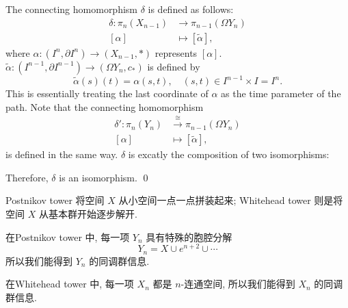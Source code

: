     The connecting homomorphism $\delta$ is defined as follows:
    \begin{align*}
        \delta: \pi_{n}(X_{n-1}) &\to \pi_{n-1}(\Omega Y_n) \\
        [\alpha] &\mapsto [\tilde{\alpha}],
    \end{align*}
    where $\alpha: (I^n,\partial I^n) \to (X_{n-1},*)$ represents $[\alpha]$. 
    $\tilde{\alpha}: (I^{n-1},\partial I^{n-1}) \to (\Omega Y_n,c_*)$ 
    is defined by 
    \begin{equation*}
        \tilde{\alpha}(s)(t) = \alpha(s,t), 
        \quad (s,t)\in I^{n-1}\times I = I^n. 
    \end{equation*}
    This is essentially treating the last coordinate of $\alpha$ 
    as the time parameter of the path. Note that the connecting homomorphism 
    \begin{align*}
        \delta': \pi_{n}(Y_n) &\xrightarrow{\cong} \pi_{n-1}(\Omega Y_n) \\
        [\alpha] &\mapsto [\tilde{\alpha}],
    \end{align*}
    is defined in the same way. $\delta$ is excatly the composition of 
    two isomorphisms:
    \begin{center}
    \end{center}
    Therefore, $\delta$ is an isomorphism.
    \qed

    \begin{remark}
        Postnikov tower 将空间 $X$ 从小空间一点一点拼装起来; 
        Whitehead tower 则是将空间 $X$ 从基本群开始逐步解开. 
        
        在Postnikov tower 中, 每一项 $Y_n$ 具有特殊的胞腔分解
        \begin{equation*}
            Y_n = X \cup e^{n+2} \cup \cdots
        \end{equation*}
        所以我们能得到 $Y_n$ 的同调群信息.
        
        在Whitehead tower 中, 每一项 $X_n$ 都是 $n$-连通空间, 
        所以我们能得到 $X_n$ 的同调群信息.
    \end{remark}

